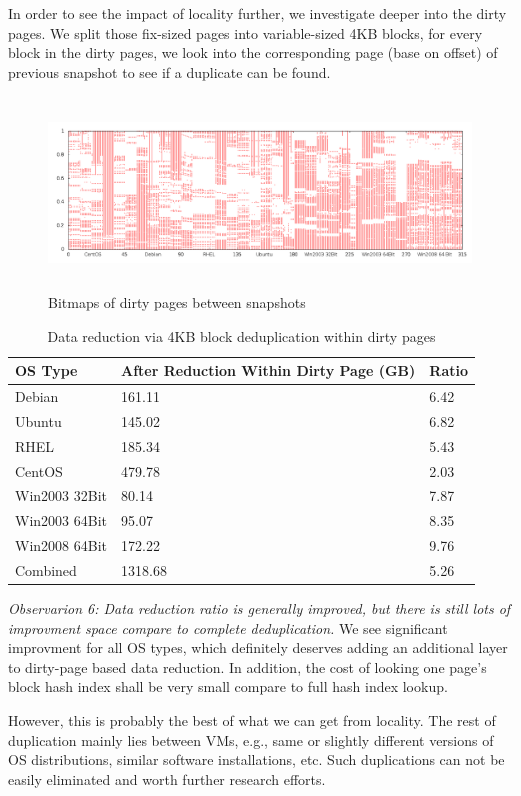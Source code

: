 In order to see the impact of locality further, we investigate deeper into the dirty pages.
We split those fix-sized pages into variable-sized 4KB blocks, for every block in the dirty pages,
we look into the corresponding
page (base on offset) of previous snapshot to see if a duplicate can be found.

\begin{figure}[tbhp]
  \centering
  \includegraphics[width=6.5in,height=2in]{countmodify.png}
\caption{Bitmaps of dirty pages between snapshots}
\label{fig:dirty}
\end{figure}

\begin{table}[htb]
  \centering
    \begin{tabular}{|l|p{1.3in}|p{0.4in}|}
        \hline
        OS Type & After Reduction Within \newline Dirty Page (GB) & Ratio \\ \hline
        Debian & 161.11 & 6.42 \\ \hline
        Ubuntu & 145.02 & 6.82 \\ \hline
        RHEL & 185.34 & 5.43 \\ \hline
        CentOS & 479.78 & 2.03 \\ \hline
        Win2003 32Bit & 80.14 & 7.87 \\ \hline
        Win2003 64Bit & 95.07 & 8.35 \\ \hline
        Win2008 64Bit & 172.22 & 9.76 \\ \hline
        Combined & 1318.68 & 5.26 \\
        \hline
    \end{tabular}
    \caption{Data reduction via 4KB block deduplication within dirty pages}
    \label{tab:locality}
\end{table}

\emph{Observarion 6: Data reduction ratio is generally improved, but there is still lots of
improvment space compare to complete deduplication.} We see significant improvment for all OS
types, which definitely deserves adding an additional layer to dirty-page based 
data reduction. In addition, the cost of looking one page's block hash index
shall be very small compare to full hash index lookup.

However, this is probably the best of what we can get from locality. The rest of
duplication mainly lies between VMs, e.g., same or slightly different versions of OS distributions, 
similar software installations, etc. Such duplications can not be easily 
eliminated and worth further research efforts.
